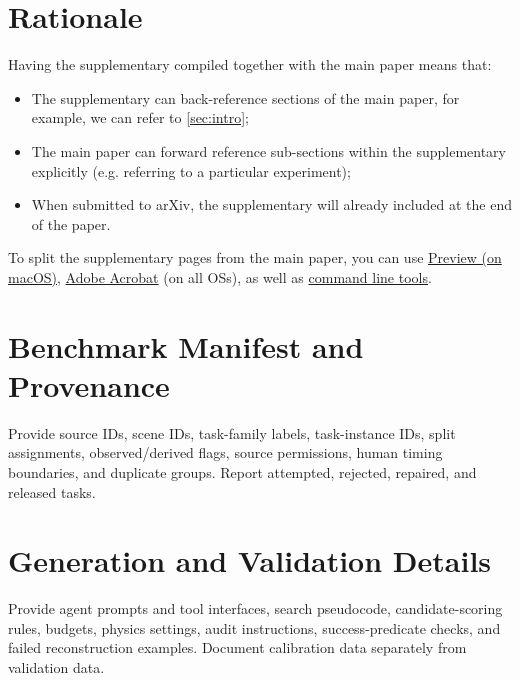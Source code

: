 \clearpage
\setcounter{page}{1}
\maketitlesupplementary


\section{Rationale}
\label{sec:rationale}
% 
Having the supplementary compiled together with the main paper means that:
% 
\begin{itemize}
\item The supplementary can back-reference sections of the main paper, for example, we can refer to \cref{sec:intro};
\item The main paper can forward reference sub-sections within the supplementary explicitly (e.g. referring to a particular experiment); 
\item When submitted to arXiv, the supplementary will already included at the end of the paper.
\end{itemize}
% 
To split the supplementary pages from the main paper, you can use \href{https://support.apple.com/en-ca/guide/preview/prvw11793/mac#:~:text=Delete%20a%20page%20from%20a,or%20choose%20Edit%20%3E%20Delete).}{Preview (on macOS)}, \href{https://www.adobe.com/acrobat/how-to/delete-pages-from-pdf.html#:~:text=Choose%20%E2%80%9CTools%E2%80%9D%20%3E%20%E2%80%9COrganize,or%20pages%20from%20the%20file.}{Adobe Acrobat} (on all OSs), as well as \href{https://superuser.com/questions/517986/is-it-possible-to-delete-some-pages-of-a-pdf-document}{command line tools}.


\section{Benchmark Manifest and Provenance}
Provide source IDs, scene IDs, task-family labels, task-instance IDs, split assignments, observed/derived flags, source permissions, human timing boundaries, and duplicate groups. Report attempted, rejected, repaired, and released tasks.

\section{Generation and Validation Details}
Provide agent prompts and tool interfaces, search pseudocode, candidate-scoring rules, budgets, physics settings, audit instructions, success-predicate checks, and failed reconstruction examples. Document calibration data separately from validation data.

